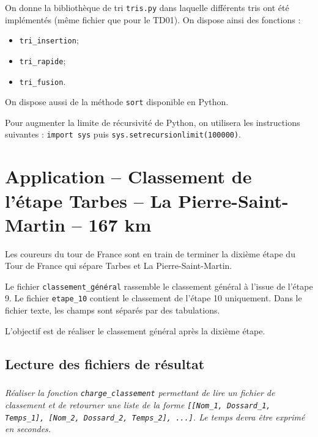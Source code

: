 \documentclass[10pt,fleqn]{article} %
\begin{document}

\vspace{5cm}
\pagestyle{fancy}
\thispagestyle{plain}


\def\columnseprulecolor{\color{ocre}}
\setlength{\columnseprule}{0.4pt} 
\begin{multicols}{2}

On donne la bibliothèque de tri \texttt{tris.py} dans laquelle différents tris ont été implémentés (même fichier que pour le TD01).
On dispose ainsi des fonctions : 
\begin{itemize}
\item \texttt{tri\_insertion};
\item \texttt{tri\_rapide};
\item \texttt{tri\_fusion}.
\end{itemize}
On dispose aussi de la méthode \texttt{sort} disponible en Python.

Pour augmenter la limite de récursivité de Python, on utilisera les instructions suivantes : \texttt{import sys} puis \texttt{sys.setrecursionlimit(100000)}.

\section*{Application -- Classement de l'étape Tarbes -- La Pierre-Saint-Martin -- 167 km}
Les coureurs du tour de France sont en train de terminer la dixième étape du Tour de France qui sépare Tarbes et La Pierre-Saint-Martin. 

Le fichier \texttt{classement\_général} rassemble le classement général à l'issue de l'étape 9. Le fichier \texttt{etape\_10} contient le classement de l'étape 10 uniquement. Dans le fichier texte, les champs sont séparés par des tabulations.


\begin{obj}
L'objectif est de réaliser le classement général après la dixième étape. 
\end{obj}

\subsection*{Lecture des fichiers de résultat}
\setcounter{exo}{0}
\subparagraph{}
\textit{Réaliser la fonction \texttt{charge\_classement} permettant de lire un fichier de classement 
et de retourner une liste de la forme \texttt{[[Nom\_1, Dossard\_1, Temps\_1], [Nom\_2, Dossard\_2, Temps\_2], ...]}. Le temps devra être exprimé en secondes.}




\end{multicols}
\end{document}
